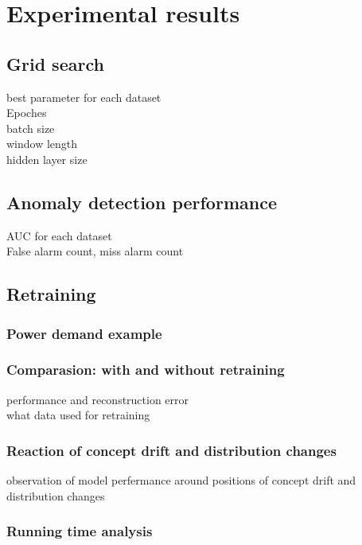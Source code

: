 \chapter{Experimental results}
\label{chap:results}


\section{Grid search}
\label{sec:gridsearch}
best parameter for each dataset\\

Epoches\\
batch size\\
window length\\
hidden layer size

\section{Anomaly detection performance}
\label{sec:performance}

AUC for each dataset\\
False alarm count, miss alarm count

\section{Retraining}
\label{sec:retraining}

\subsection{Power demand example}
\label{sec:example}

\subsection{Comparasion: with and without retraining}
\label{sec: compare}

performance and reconstruction error\\
what data used for retraining


\subsection{Reaction of concept drift and distribution changes}
\label{sec:reaction}
observation of model perfermance around positions of concept drift and distribution changes 

\subsection{Running time analysis}
\label{sec:time}




